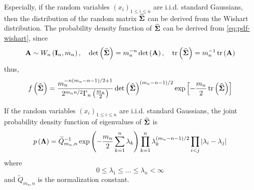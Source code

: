 \begin{remark}
	Especially, if the random variables $\left(x_{i}\right)_{1\leq i\leq n}$ are i.i.d. standard Gaussians, then the distribution of the random matrix $\widehat{\boldsymbol{\Sigma}}$ can be derived from the Wishart distribution. The probability density function of $\widehat{\boldsymbol{\Sigma}}$ can be derived from \eqref{eq:pdf-wishart}, since
	\begin{equation*}
		{\bf A}\sim W_{n}\left(\mathbf{I}_{n},m_{n}\right),\quad\operatorname{det}\left(\widehat{\boldsymbol{\Sigma}}\right)=m_{n}^{-n}\operatorname{det}\left({\bf A}\right),\quad\operatorname{tr}\left(\widehat{\boldsymbol{\Sigma}}\right)=m_{n}^{-1}\operatorname{tr}\left({\bf A}\right)
	\end{equation*}
	thus,
	\begin{equation}
		f\left(\widehat{\boldsymbol{\Sigma}}\right)=\frac{m_{n}^{-n(m_{n}-n-1)/2+1}}{2^{m_{n}n/2}\Gamma_{n}\left(\frac{m_{n}}{2}\right)}\operatorname{det}\left(\widehat{\boldsymbol{\Sigma}}\right)^{(m_{n}-n-1)/2}\exp\left[-\frac{m_{n}}{2}\operatorname{tr}\left(\widehat{\boldsymbol{\Sigma}}\right)\right]
	\end{equation}
\end{remark}

\begin{theorem}
	If the random variables $\left(x_{i}\right)_{1\leq i\leq n}$ are i.i.d. standard Gaussians, the joint probability density function of eigenvalues of $\widehat{\boldsymbol{\Sigma}}$ is
	\begin{equation}
		p\left(\boldsymbol{\Lambda}\right)=\widetilde{Q}_{m_{n},n}^{-1}\exp\left(-\frac{m_{n}}{2}\sum_{k=1}^{n}\lambda_{k}\right)\prod_{k=1}^{n}\lambda_{k}^{(m_{n}-n-1)/2}\prod_{i<j}\left|\lambda_{i}-\lambda_{j}\right|
		\label{eq:jpdf-eigenvalues-sigma}
	\end{equation}
	where
	\begin{equation*}
		0\leq\lambda_{1}\leq\ldots\leq\lambda_{n}<\infty
	\end{equation*}
	and $\widetilde{Q}_{m_{n},n}$ is the normalization constant.
\end{theorem}

